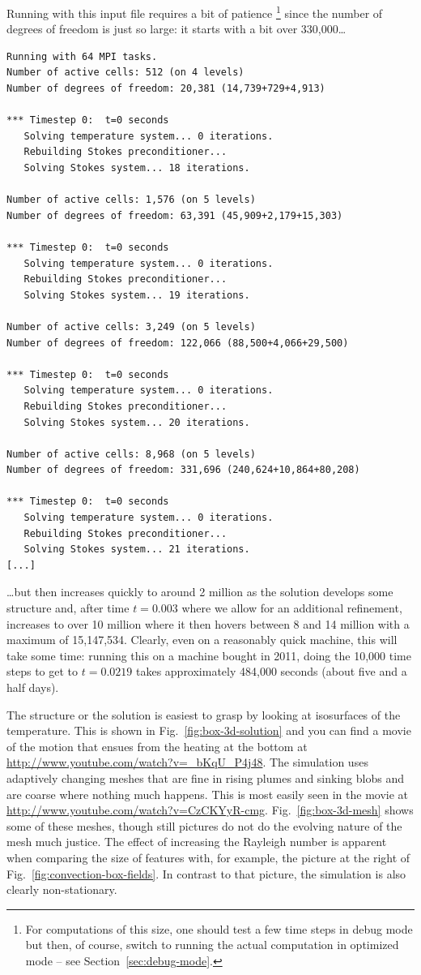 \documentclass{article}
\begin{document}
Running with this input file requires a bit of patience%
\footnote{For computations of this size, one should test a few time steps in
  debug mode but then, of course, switch to running the actual computation in
  optimized mode -- see Section~\ref{sec:debug-mode}.}
since the number of
degrees of freedom is just so large: it starts with a bit over 330,000\ldots
\begin{lstlisting}[frame=single,language=ksh]
Running with 64 MPI tasks.
Number of active cells: 512 (on 4 levels)
Number of degrees of freedom: 20,381 (14,739+729+4,913)

*** Timestep 0:  t=0 seconds
   Solving temperature system... 0 iterations.
   Rebuilding Stokes preconditioner...
   Solving Stokes system... 18 iterations.

Number of active cells: 1,576 (on 5 levels)
Number of degrees of freedom: 63,391 (45,909+2,179+15,303)

*** Timestep 0:  t=0 seconds
   Solving temperature system... 0 iterations.
   Rebuilding Stokes preconditioner...
   Solving Stokes system... 19 iterations.

Number of active cells: 3,249 (on 5 levels)
Number of degrees of freedom: 122,066 (88,500+4,066+29,500)

*** Timestep 0:  t=0 seconds
   Solving temperature system... 0 iterations.
   Rebuilding Stokes preconditioner...
   Solving Stokes system... 20 iterations.

Number of active cells: 8,968 (on 5 levels)
Number of degrees of freedom: 331,696 (240,624+10,864+80,208)

*** Timestep 0:  t=0 seconds
   Solving temperature system... 0 iterations.
   Rebuilding Stokes preconditioner...
   Solving Stokes system... 21 iterations.
[...]
\end{lstlisting}
\ldots{}but then increases quickly to around 2 million as the solution develops
some structure and, after time $t=0.003$ where we allow for an additional
refinement, increases to over 10 million where it then hovers between 8 and 14
million with a maximum of 15,147,534. Clearly, even on a reasonably quick
machine, this will take some time: running this on a machine bought in 2011,
doing the 10,000 time steps to get to $t=0.0219$ takes approximately 484,000
seconds (about five and a half days).

The structure or the solution is easiest to grasp by looking at isosurfaces of
the temperature. This is shown in Fig.~\ref{fig:box-3d-solution} and you can
find a movie of the motion that ensues from the heating at the bottom at
\url{http://www.youtube.com/watch?v=_bKqU_P4j48}. The simulation uses adaptively
changing meshes that are fine in rising plumes and sinking blobs and are coarse
where nothing much happens. This is most easily seen in the movie at
\url{http://www.youtube.com/watch?v=CzCKYyR-cmg}. Fig.~\ref{fig:box-3d-mesh}
shows some of these meshes, though still pictures do not do the evolving nature
of the mesh much justice. The effect of increasing the Rayleigh number is
apparent when comparing the size of features with, for example, the picture at
the right of Fig.~\ref{fig:convection-box-fields}. In contrast to that picture,
the simulation is also clearly non-stationary.
\end{document}
